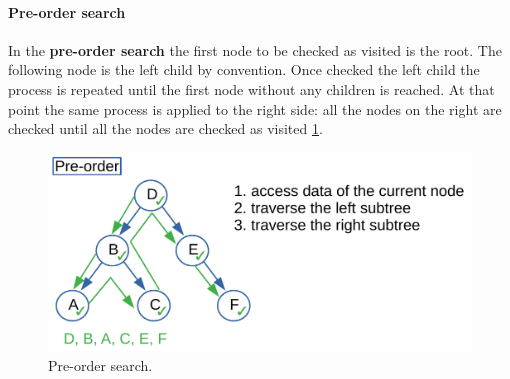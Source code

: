 \paragraph{Pre-order search}
\label{preorder}
In the \textbf{pre-order search} the first node to be checked as visited is the root. The following node is the left child by convention. Once checked the left child the process is repeated until the first node without any children is reached. At that point the same process is applied to the right side: all the nodes on the right are checked until all the nodes are checked as visited \ref{trees_5}.

\begin{figure}[H]
	\begin{center}
		\includegraphics[scale=.6]{chapters/trees/images/trees_5.pdf}
		\caption[Pre-order search.]{Pre-order search.}
		\label{trees_5}
	\end{center}
\end{figure}

